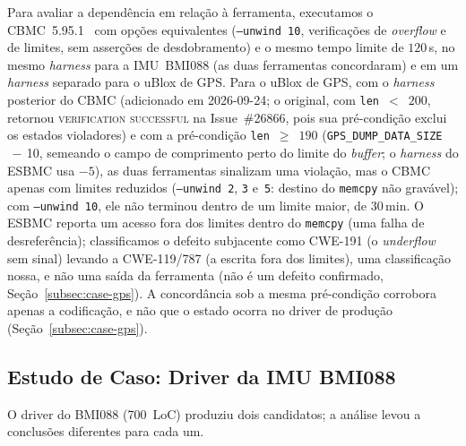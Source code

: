\documentclass[conference]{IEEEtran}
\begin{document}
Para avaliar a dependência em relação à ferramenta, executamos o
CBMC~5.95.1~\cite{Kroening2014} com opções equivalentes
(\texttt{--unwind~10}, verificações de \textit{overflow} e de
limites, sem asserções de desdobramento) e o mesmo tempo limite de
$120$\,s, no mesmo \textit{harness} para a IMU~BMI088 (as duas
ferramentas concordaram) e em um \textit{harness} separado para o
uBlox de GPS. Para o uBlox de GPS, com o \textit{harness} posterior
do CBMC (adicionado em 2026-09-24; o original, com
\texttt{len}~$<$~$200$, retornou \textsc{verification successful} na
Issue~\#26866, pois sua pré-condição exclui os estados violadores) e
com a pré-condição \texttt{len}~$\geq$~$190$
(\texttt{GPS\_DUMP\_DATA\_SIZE}$\,-\,$10, semeando o campo de
comprimento perto do limite do \textit{buffer}; o \textit{harness} do
ESBMC usa $-5$), as duas ferramentas sinalizam uma violação, mas o
CBMC apenas com limites reduzidos (\texttt{--unwind~2}, \texttt{3}
e~\texttt{5}: destino do \texttt{memcpy} não gravável); com
\texttt{--unwind~10}, ele não terminou dentro de um limite maior, de
$30$\,min.
O ESBMC reporta um acesso fora dos limites dentro do \texttt{memcpy}
(uma falha de desreferência); classificamos o defeito subjacente como
CWE-191 (o \textit{underflow} sem sinal) levando a CWE-119/787 (a
escrita fora dos limites), uma classificação nossa, e não uma saída
da ferramenta (não é um defeito confirmado,
Seção~\ref{subsec:case-gps}).
A concordância sob a mesma pré-condição corrobora apenas a
codificação, e não que o estado ocorra no driver de produção
(Seção~\ref{subsec:case-gps}).

\subsection{Estudo de Caso: Driver da IMU BMI088}
\label{subsec:case-imu}

O driver do BMI088 (700~LoC) produziu dois candidatos; a análise
levou a conclusões diferentes para cada um.
\end{document}
